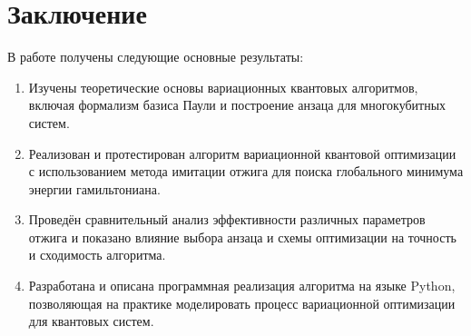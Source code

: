 \documentclass[a4paper]{report}
\begin{document}

\chapter*{Заключение}

В работе получены следующие основные результаты:
\begin{enumerate}
    \item{Изучены теоретические основы вариационных квантовых алгоритмов, включая формализм базиса Паули и построение анзаца для многокубитных систем.}
    \item{Реализован и протестирован алгоритм вариационной квантовой оптимизации с использованием метода имитации отжига для поиска глобального минимума энергии гамильтониана.}
    \item{Проведён сравнительный анализ эффективности различных параметров отжига и показано влияние выбора анзаца и схемы оптимизации на точность и сходимость алгоритма.}
    \item{Разработана и описана программная реализация алгоритма на языке Python, позволяющая на практике моделировать процесс вариационной оптимизации для квантовых систем.}
\end{enumerate}



\end{document}
